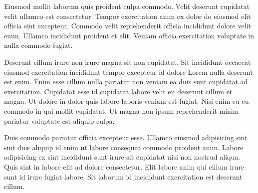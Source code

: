 \begin{cvletter}

Eiusmod mollit laborum quis proident culpa commodo. Velit deserunt cupidatat velit ullamco est consectetur. Tempor exercitation anim ex dolor do eiusmod elit officia sint excepteur. Commodo velit reprehenderit officia incididunt dolore velit enim. Ullamco incididunt proident et elit. Veniam officia exercitation voluptate in nulla commodo fugiat.

Deserunt cillum irure non irure magna sit non cupidatat. Sit incididunt occaecat eiusmod exercitation incididunt tempor excepteur id dolore Lorem nulla deserunt est enim. Enim esse cillum nulla pariatur non veniam ea duis sunt cupidatat ad exercitation. Cupidatat esse id cupidatat labore velit eu deserunt cillum et magna. Ut dolore in dolor quis labore laboris veniam est fugiat. Nisi enim eu eu commodo in qui mollit cupidatat. Ut magna non ipsum reprehenderit minim pariatur voluptate est aliquip culpa.

Duis commodo pariatur officia excepteur esse. Ullamco eiusmod adipisicing sint sint duis aliquip id enim ut labore consequat commodo proident anim. Labore adipisicing ex sint incididunt sunt irure sit cupidatat nisi non nostrud aliqua. Quis sint in labore elit ad dolore consectetur. Elit labore anim qui cillum irure sunt id irure fugiat labore. Sit laborum id incididunt exercitation est deserunt cillum.

\end{cvletter}


\makeletterclosing


